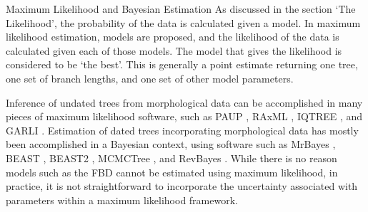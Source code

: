\begin{boxedtext}{Maximum Likelihood and Bayesian Estimation}
As discussed in the section `The Likelihood', the probability of the data is calculated given a model. 
In maximum likelihood estimation, models are proposed, and the likelihood of the data is calculated given each of those models.
The model that gives the  likelihood is considered to be `the best'.
This is generally a point estimate returning one tree, one set of branch lengths, and one set of other model parameters.

Inference of undated trees from  morphological data can be accomplished in many pieces of maximum likelihood software, such as PAUP \citep{Swofford2003}, RAxML \citep{Stamatakis2014}, IQTREE \citep{IQtree}, and GARLI \citep{zwickl2006}.
Estimation of dated trees incorporating  morphological data has mostly been accomplished in a Bayesian context, using software such as MrBayes \citep{Huelsenbeck2002, Ronquist2003}, BEAST \citep{BEAST}, BEAST2 \citep{BEAST2}, MCMCTree \citep{MCMCtree}, and RevBayes \citep{Hoehna2014b, Hoehna2016b}.
While there is no reason models such as the FBD cannot be estimated using maximum likelihood, in practice, it is not straightforward to incorporate the uncertainty associated with parameters within a maximum likelihood framework.
\end{boxedtext}
